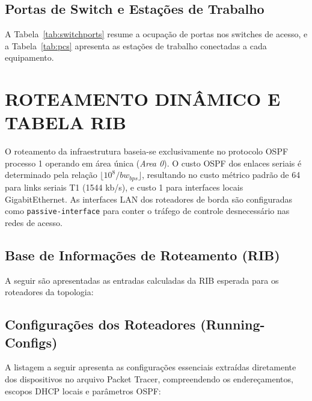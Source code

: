 \subsection{Portas de Switch e Estações de Trabalho}

A Tabela~\ref{tab:switchports} resume a ocupação de portas nos switches de acesso, e a Tabela~\ref{tab:pcs} apresenta as estações de trabalho conectadas a cada equipamento.

\begin{table}[H]
\centering
\small

\caption{Mapeamento de portas dos comutadores.}
\label{tab:switchports}
\end{table}

\begin{table}[H]
\centering
\small

\caption{Estações de trabalho conectadas.}
\label{tab:pcs}
\end{table}

\section{ROTEAMENTO DINÂMICO E TABELA RIB}

O roteamento da infraestrutura baseia-se exclusivamente no protocolo OSPF processo 1 operando em área única (\textit{Area 0}). O custo OSPF dos enlaces seriais é determinado pela relação $\lfloor 10^8 / bw_{bps} \rfloor$, resultando no custo métrico padrão de 64 para links seriais T1 (1544 kb/s), e custo 1 para interfaces locais GigabitEthernet. As interfaces LAN dos roteadores de borda são configuradas como \texttt{passive-interface} para conter o tráfego de controle desnecessário nas redes de acesso.

\subsection{Base de Informações de Roteamento (RIB)}

A seguir são apresentadas as entradas calculadas da RIB esperada para os roteadores da topologia:



\subsection{Configurações dos Roteadores (Running-Configs)}

A listagem a seguir apresenta as configurações essenciais extraídas diretamente dos dispositivos no arquivo Packet Tracer, compreendendo os endereçamentos, escopos DHCP locais e parâmetros OSPF:


